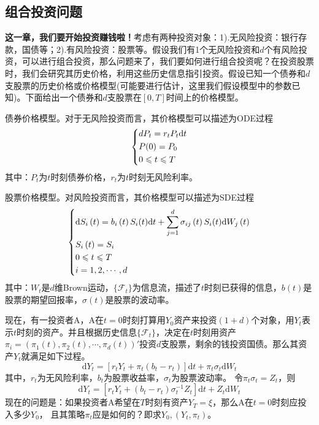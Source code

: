 	\subsection{组合投资问题}
		\label{subsec:组合投资问题}

		\textbf{这一章，我们要开始投资赚钱啦！}考虑有两种投资对象：1).无风险投资：银行存款，国债等；2).有风险投资：股票等。假设我们有1个无风险投资和$d$个有风险投资，可以进行组合投资，那么问题来了，我们要如何进行组合投资呢？在投资股票时，我们会研究其历史价格，利用这些历史信息指引投资。假设已知一个债券和$d$支股票的历史价格或价格模型(可能要进行估计，这里我们假设模型中的参数已知)。下面给出一个债券和$d$支股票在$[0,T]$时间上的价格模型。
		\par
		 债券价格模型。对于无风险投资而言，其价格模型可以描述为ODE过程
		\begin{equation*}
			\centering
			\left\{
			\begin{lgathered}
			{d{P_t} = {r_t}  {P_t}\mathrm{d}t}\\
			{P(0) = {P_0}}\\
			{0 \leqslant t \leqslant T}
			\end{lgathered}
			\right.
		 \end{equation*}
		其中：$P_t$为$t$时刻债券价格，$r_t$为$t$时刻无风险利率。
		\par
		股票价格模型。对风险投资而言，其价格模型可以描述为SDE过程
		\begin{equation*}
		\centering
		\left\{\begin{lgathered}
		{\mathrm{d}{S_i}\left( t \right) = {b_i}\left( t \right) {S_i}{{\left( t \right)}} \mathrm{d}t + \sum\limits_{j = 1}^d {{\sigma _{ij}}\left( t \right) {S_i}{{\left( t \right)}}\mathrm{d}{W_j}\left( t \right)} }\\
		{{S_i}\left( t \right) = {S_i}}\\
		{0 \leqslant t \leqslant T}\\
		{i = 1,2, \cdots ,d}
		\end{lgathered} \right.
		 \end{equation*}
		其中：$W_t$是$d$维Brown运动，$\{\mathcal{F}_t\}$为信息流，描述了$t$时刻已获得的信息，$b(t)$是股票的期望回报率，$\sigma ( t )$是股票的波动率。
		\par
		现在，有一投资者A，A在$t=0$时刻打算用$Y_0$资产来投资$(1+d)$个对象，用$Y_t$表示$t$时刻的资产。并且根据历史信息$\{\mathcal{F}_t\}$，决定在$t$时刻用资产$\pi _i = ({{\pi _1}( t ),{\pi _2}(t), \cdots ,{\pi _d}(t)} )'$投资$d$支股票，剩余的钱投资国债。那么其资产$Y_t$就满足如下过程。
		\[\mathrm{d}Y_t=[r_tY_t+\pi _t(b_t-r_t)]{\mathrm{d}}t+{\pi}_t{\sigma _t} {\mathrm{d}}W_t\]
		其中，$r_t$为无风险利率，$b_t$为股票收益率，$\sigma_t$为股票波动率。
		令${\pi _t}{\sigma _t} = {Z_t}$，则
		\[{\mathrm{d}}Y_t=[r_tY_t+(b_t-r_t)\sigma _t^{-1}Z_t]\mathrm{d}t + Z_t{\mathrm{d}}W_t\]
		现在的问题是：如果投资者A希望在$T$时刻有资产${Y_T} = \xi $，那么A在$t=0$时刻应投入多少$Y_0$， 且其策略$\pi _t$应是如何的？即求$Y_0,(Y_t,\pi_t)$。

